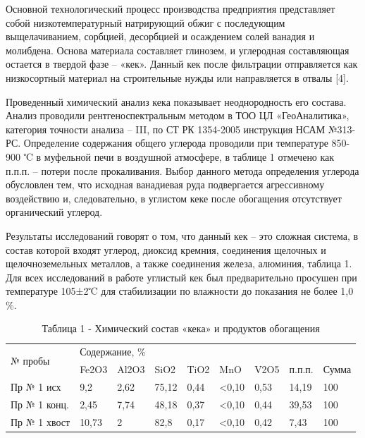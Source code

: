 \begin{multicols}{2}
Основной технологический процесс производства предприятия представляет
собой низкотемпературный натрирующий обжиг с последующим выщелачиванием,
сорбцией, десорбцией и осаждением солей ванадия и молибдена. Основа
материала составляет глинозем, и углеродная составляющая остается в
твердой фазе -- «кек». Данный кек после фильтрации отправляется как
низкосортный материал на строительные нужды или направляется в отвалы
{[}4{]}.

Проведенный химический анализ кека показывает неоднородность его
состава. Анализ проводили рентгеноспектральным методом в ТОО ЦЛ
«ГеоАналитика», категория точности анализа -- III, по СТ РК 1354-2005
инструкция НСАМ №313-РС. Определение содержания общего углерода
проводили при температуре 850-900 ℃ в муфельной печи в воздушной
атмосфере, в таблице 1 отмечено как п.п.п. -- потери после прокаливания.
Выбор данного метода определения углерода обусловлен тем, что исходная
ванадиевая руда подвергается агрессивному воздействию и, следовательно,
в углистом кеке после обогащения отсутствует органический углерод.

Результаты исследований говорят о том, что данный кек -- это сложная
система, в состав которой входят уг­лерод, диоксид кремния, соединения
щелочных и щелочноземельных ме­тал­лов, а также соединения железа,
алюминия, таблица 1. Для всех исследований в работе углистый кек был
предварительно просушен при температуре 105±2℃ для стабилизации по
влажности до показания не более 1,0 \%.
\end{multicols}

\begin{table}[H]
\caption*{Таблица 1 - Химический состав «кека» и продуктов обогащения}
\centering
\begin{tabular}{|l|llllllll|}
\hline
\multirow{2}{*}{№ пробы} & \multicolumn{8}{l|}{Содержание, \%} \\ \cline{2-9}
 & \multicolumn{1}{l|}{Fe2O3} & \multicolumn{1}{l|}{Al2O3} & \multicolumn{1}{l|}{SiO2} & \multicolumn{1}{l|}{TiO2} & \multicolumn{1}{l|}{MnO} & \multicolumn{1}{l|}{V2O5} & \multicolumn{1}{l|}{п.п.п.} & Сумма \\ \hline
Пр № 1 исх & \multicolumn{1}{l|}{9,2} & \multicolumn{1}{l|}{2,62} & \multicolumn{1}{l|}{75,12} & \multicolumn{1}{l|}{0,44} & \multicolumn{1}{l|}{\textless{}0,10} & \multicolumn{1}{l|}{0,53} & \multicolumn{1}{l|}{14,19} & 100 \\ \hline
Пр № 1 конц. & \multicolumn{1}{l|}{2,45} & \multicolumn{1}{l|}{7,74} & \multicolumn{1}{l|}{48,18} & \multicolumn{1}{l|}{0,37} & \multicolumn{1}{l|}{\textless{}0,10} & \multicolumn{1}{l|}{0,44} & \multicolumn{1}{l|}{39,53} & 100 \\ \hline
Пр № 1 хвост & \multicolumn{1}{l|}{10,73} & \multicolumn{1}{l|}{2} & \multicolumn{1}{l|}{82,8} & \multicolumn{1}{l|}{0,17} & \multicolumn{1}{l|}{\textless{}0,10} & \multicolumn{1}{l|}{0,42} & \multicolumn{1}{l|}{7,43} & 100 \\ \hline
\end{tabular}
\end{table}

